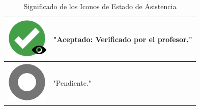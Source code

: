\begin{table}[h!]
\begin{tabular}{|c|l|}
		\hline
		\includegraphics[width=2cm]{images/icono7.png} & "Aceptado: Verificado por el profesor." \\
		\hline
		\includegraphics[width=2cm]{images/icono8.png} & "Pendiente." \\
		\hline
	\end{tabular}
	\caption{Significado de los Iconos de Estado de Asistencia}
	\label{tab:iconosAsistencia}
\end{table}

\newpage